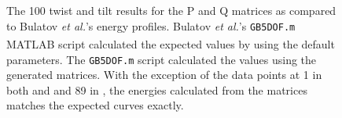 \documentclass[twoside,senior]{BYUPhys}
\begin{document}
\begin{figure}[ht!]
 \centering
 
 \quad
 \caption[A comparison of the \textlangle{}100\textrangle{} copper curve with the calculated results.]{\label{fig:compare100} The \textlangle{}100\textrangle{} twist \protect{} and tilt \protect{} results for the P and Q matrices as compared to Bulatov \emph{et al.}'s energy profiles. Bulatov \emph{et al.}'s \lstinline!GB5DOF.m! MATLAB\textsuperscript{\textregistered} script calculated the expected values by using the default parameters.  The \lstinline!GB5DOF.m! script calculated the values using the generated matrices. With the exception of the data points at 1\textdegree{} in both \protect{} and \protect{} and 89\textdegree{} in \protect{}, the energies calculated from the matrices matches the expected curves exactly.}
\end{figure}
\end{document}
